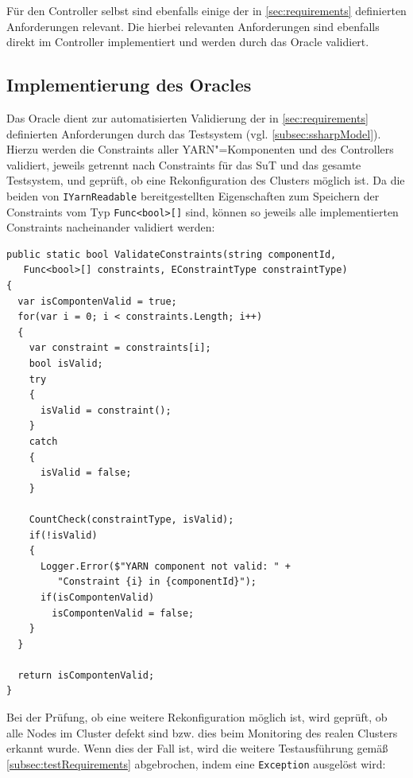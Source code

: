Für den Controller selbst sind ebenfalls einige der in \cref{sec:requirements} definierten Anforderungen relevant.
Die hierbei relevanten Anforderungen sind ebenfalls direkt im Controller implementiert und werden durch das Oracle validiert.

\subsection{Implementierung des Oracles}
\label{subsec:oracleImpl}

Das Oracle dient zur automatisierten Validierung der in \cref{sec:requirements} definierten Anforderungen durch das Testsystem (vgl. \cref{subsec:ssharpModel}).
Hierzu werden die Constraints aller YARN"=Komponenten und des Controllers validiert, jeweils getrennt nach Constraints für das \gls{SuT} und das gesamte Testsystem, und geprüft, ob eine Rekonfiguration des Clusters möglich ist.
Da die beiden von \texttt{IYarnReadable} bereitgestellten Eigenschaften zum Speichern der Constraints vom Typ \texttt{Func<bool>[]} sind, können so jeweils alle implementierten Constraints nacheinander validiert werden:

\begin{lstlisting}[label=lst:oracleValidateConstraints,style=cs,
caption={[Validieren der Constraints durch das Oracle]
    Validieren der Constraints durch das Oracle.
    Die zu validierenden Constraints werden im Parameter \texttt{constraints} übergeben, der Parameter \texttt{constraintType} dient zu statistischen Zwecken in \texttt{CountCheck()}.}]
public static bool ValidateConstraints(string componentId,
   Func<bool>[] constraints, EConstraintType constraintType)
{
  var isCompontenValid = true;
  for(var i = 0; i < constraints.Length; i++)
  {
    var constraint = constraints[i];
    bool isValid;
    try
    {
      isValid = constraint();
    }
    catch
    {
      isValid = false;
    }
    
    CountCheck(constraintType, isValid);
    if(!isValid)
    {
      Logger.Error($"YARN component not valid: " +
         "Constraint {i} in {componentId}");
      if(isCompontenValid)
        isCompontenValid = false;
    }
  }
  
  return isCompontenValid;
}
\end{lstlisting}

Bei der Prüfung, ob eine weitere Rekonfiguration möglich ist, wird geprüft, ob alle Nodes im Cluster defekt sind bzw. dies beim Monitoring des realen Clusters erkannt wurde.
Wenn dies der Fall ist, wird die weitere Testausführung gemäß \cref{subsec:testRequirements} abgebrochen, indem eine \texttt{Exception} ausgelöst wird:

